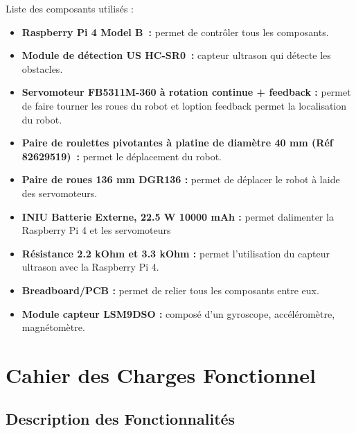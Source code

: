\documentclass[a4paper,12pt]{report}  %
\begin{document}
Liste des composants utilisés : 

\begin{itemize}
	\item
	\textbf{Raspberry Pi 4 Model B :} permet de contrôler tous les
	composants.
	
	\item
	\textbf{Module de détection US HC-SR0 :} capteur ultrason qui détecte
	les obstacles.
	
	\item
	\textbf{Servomoteur FB5311M-360 à rotation continue + feedback :}
	permet de faire tourner les roues du robot et l\textquotesingle option
	feedback permet la localisation du robot.
	
	\item
	\textbf{Paire de roulettes pivotantes à platine 
		de diamètre 40 mm (Réf 82629519) :} permet le déplacement du robot.
	
	\item
	\textbf{Paire de roues 136 mm DGR136 :} permet de déplacer le robot à
	l\textquotesingle aide des servomoteurs.
	
	\item
	\textbf{INIU Batterie Externe, 22.5 W 10000 mAh :} permet
	d\textquotesingle alimenter la Raspberry Pi 4 et les servomoteurs
	
	\item
	\textbf{Résistance 2.2 kOhm et 3.3 kOhm :} permet l'utilisation du
	capteur ultrason avec la Raspberry Pi 4.
	
	\item
	\textbf{Breadboard/PCB :} permet de relier tous les composants entre
	eux.
	
	\item
	\textbf{Module capteur LSM9DSO :} composé d'un gyroscope,
	accéléromètre, magnétomètre.
\end{itemize}

\section{Cahier des Charges Fonctionnel}
\subsection{Description des Fonctionnalités}
\end{document}
